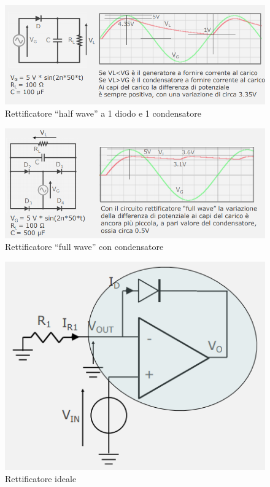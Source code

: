 \documentclass{article}
\begin{document}
\begin{figure}[h]
  \centering
  \includegraphics[scale=0.6]{IM_rettificatore_half_wave_c}
  \caption{Rettificatore ``half wave'' a 1 diodo e 1 condensatore}
  \label{Schema_rettificatore_half_wave_c}
\end{figure}
\begin{figure}[h]
  \centering
  \includegraphics[scale=0.6]{IM_rettificatore_full_wave_c}
  \caption{Rettificatore ``full wave'' con condensatore}
  \label{Schema_rettificatore_full_wave_c}
\end{figure}

\clearpage

\begin{figure}[h]
  \centering
  \includegraphics[scale=0.7]{IM_rettificatore_ideale}
  \caption{Rettificatore ideale}
  \label{Schema_rettificatore_ideale}
\end{figure}
\end{document}

